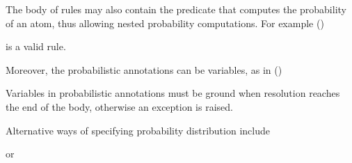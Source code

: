 \documentclass[letterpaper,10pt,english]{sphinxmanual}
\begin{document}
\sphinxAtStartPar
The body of rules may also contain the predicate  that computes the probability of an atom,
thus allowing nested probability computations.
For example ()

\begin{sphinxVerbatim}[commandchars=\\\{\}]
      
\end{sphinxVerbatim}

\sphinxAtStartPar
is a valid rule.

\sphinxAtStartPar
Moreover, the probabilistic annotations can be variables, as in ()

\begin{sphinxVerbatim}[commandchars=\\\{\}]

 
        
\end{sphinxVerbatim}

\sphinxAtStartPar
Variables in probabilistic annotations must be ground when resolution reaches the end of the body, otherwise an exception is raised.

\sphinxAtStartPar
Alternative ways of specifying probability distribution include

\begin{sphinxVerbatim}[commandchars=\\\{\}]
\end{sphinxVerbatim}

\sphinxAtStartPar
or

\begin{sphinxVerbatim}[commandchars=\\\{\}]
\end{sphinxVerbatim}
\end{document}
